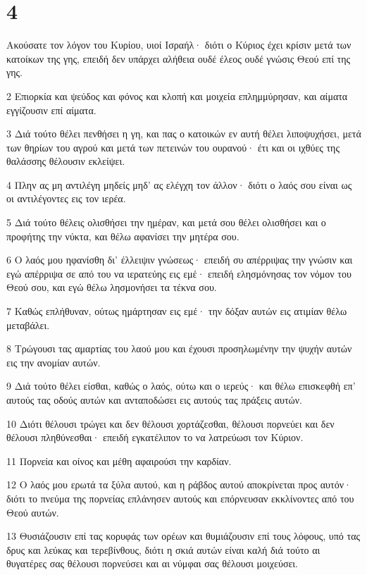 \chapter{4}

\par Ακούσατε τον λόγον του Κυρίου, υιοί Ισραήλ· διότι ο Κύριος έχει κρίσιν μετά των κατοίκων της γης, επειδή δεν υπάρχει αλήθεια ουδέ έλεος ουδέ γνώσις Θεού επί της γης.
\par 2 Επιορκία και ψεύδος και φόνος και κλοπή και μοιχεία επλημμύρησαν, και αίματα εγγίζουσιν επί αίματα.
\par 3 Διά τούτο θέλει πενθήσει η γη, και πας ο κατοικών εν αυτή θέλει λιποψυχήσει, μετά των θηρίων του αγρού και μετά των πετεινών του ουρανού· έτι και οι ιχθύες της θαλάσσης θέλουσιν εκλείψει.
\par 4 Πλην ας μη αντιλέγη μηδείς μηδ' ας ελέγχη τον άλλον· διότι ο λαός σου είναι ως οι αντιλέγοντες εις τον ιερέα.
\par 5 Διά τούτο θέλεις ολισθήσει την ημέραν, και μετά σου θέλει ολισθήσει και ο προφήτης την νύκτα, και θέλω αφανίσει την μητέρα σου.
\par 6 Ο λαός μου ηφανίσθη δι' έλλειψιν γνώσεως· επειδή συ απέρριψας την γνώσιν και εγώ απέρριψα σε από του να ιερατεύης εις εμέ· επειδή ελησμόνησας τον νόμον του Θεού σου, και εγώ θέλω λησμονήσει τα τέκνα σου.
\par 7 Καθώς επλήθυναν, ούτως ημάρτησαν εις εμέ· την δόξαν αυτών εις ατιμίαν θέλω μεταβάλει.
\par 8 Τρώγουσι τας αμαρτίας του λαού μου και έχουσι προσηλωμένην την ψυχήν αυτών εις την ανομίαν αυτών.
\par 9 Διά τούτο θέλει είσθαι, καθώς ο λαός, ούτω και ο ιερεύς· και θέλω επισκεφθή επ' αυτούς τας οδούς αυτών και ανταποδώσει εις αυτούς τας πράξεις αυτών.
\par 10 Διότι θέλουσι τρώγει και δεν θέλουσι χορτάζεσθαι, θέλουσι πορνεύει και δεν θέλουσι πληθύνεσθαι· επειδή εγκατέλιπον το να λατρεύωσι τον Κύριον.
\par 11 Πορνεία και οίνος και μέθη αφαιρούσι την καρδίαν.
\par 12 Ο λαός μου ερωτά τα ξύλα αυτού, και η ράβδος αυτού αποκρίνεται προς αυτόν· διότι το πνεύμα της πορνείας επλάνησεν αυτούς και επόρνευσαν εκκλίνοντες από του Θεού αυτών.
\par 13 Θυσιάζουσιν επί τας κορυφάς των ορέων και θυμιάζουσιν επί τους λόφους, υπό τας δρυς και λεύκας και τερεβίνθους, διότι η σκιά αυτών είναι καλή διά τούτο αι θυγατέρες σας θέλουσι πορνεύσει και αι νύμφαι σας θέλουσι μοιχεύσει.

